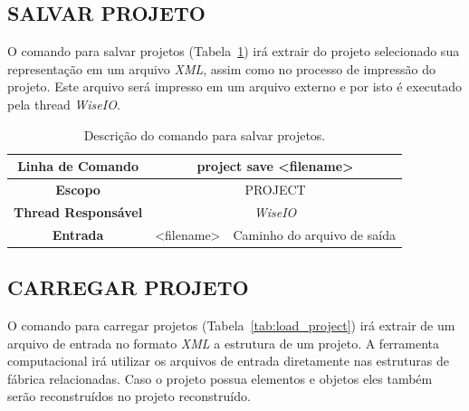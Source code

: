 \subsection{SALVAR PROJETO}\label{sec:save_projects}

O comando para salvar projetos (Tabela~\ref{tab:save_project}) irá extrair do projeto selecionado sua representação em um arquivo \textit{XML}, assim como no processo de impressão do projeto. Este arquivo será impresso em um arquivo externo e por isto é executado pela thread \textit{WiseIO}.

\begin{center}
	\begin{table}[!htbp]
		\begin{tabularx}{\textwidth}{c|c|X}
			\toprule
			\textbf{Linha de Comando} & \multicolumn{2}{c}{project save <file\underline{\space\space}name>} \\
			\midrule
			\textbf{Escopo} & \multicolumn{2}{c}{PROJECT} \\
			\hline
			\textbf{Thread Responsável} & \multicolumn{2}{c}{\textit{WiseIO}} \\
			\hline
			\textbf{Entrada} & <file\underline{\space\space}name> & Caminho do arquivo de saída \\
			\bottomrule
		\end{tabularx}
		\caption{Descrição do comando para salvar projetos.}
		\label{tab:save_project}
	\end{table}
\end{center}

\subsection{CARREGAR PROJETO}\label{sec:load_projects}

O comando para carregar projetos (Tabela~\ref{tab:load_project}) irá extrair de um arquivo de entrada no formato \textit{XML} a estrutura de um projeto. A ferramenta computacional irá utilizar os arquivos de entrada diretamente nas estruturas de fábrica relacionadas. Caso o projeto possua elementos e objetos eles também serão reconstruídos no projeto reconstruído.

